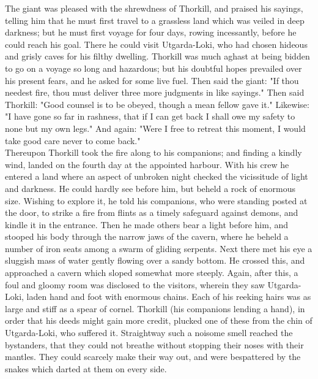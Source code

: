 \documentclass[10pt,a4paper]{report}
\begin{document}
The giant was pleased with the shrewdness of Thorkill, and praised his sayings, telling him that he must first travel to a grassless land which was veiled in deep darkness; but he must first voyage for four days, rowing incessantly, before he could reach his goal. There he could visit Utgarda-Loki, who had chosen hideous and grisly caves for his filthy dwelling. Thorkill was much aghast at being bidden to go on a voyage so long and hazardous; but his doubtful hopes prevailed over his present fears, and he asked for some live fuel. Then said the giant: "If thou needest fire, thou must deliver three more judgments in like sayings." Then said Thorkill: "Good counsel is to be obeyed, though a mean fellow gave it." Likewise: "I have gone so far in rashness, that if I can get back I shall owe my safety to none but my own legs." And again: "Were I free to retreat this moment, I would take good care never to come back."\\

Thereupon Thorkill took the fire along to his companions; and finding a kindly wind, landed on the fourth day at the appointed harbour. With his crew he entered a land where an aspect of unbroken night checked the vicissitude of light and darkness. He could hardly see before him, but beheld a rock of enormous size. Wishing to explore it, he told his companions, who were standing posted at the door, to strike a fire from flints as a timely safeguard against demons, and kindle it in the entrance. Then he made others bear a light before him, and stooped his body through the narrow jaws of the cavern, where he beheld a number of iron seats among a swarm of gliding serpents. Next there met his eye a sluggish mass of water gently flowing over a sandy bottom. He crossed this, and approached a cavern which sloped somewhat more steeply. Again, after this, a foul and gloomy room was disclosed to the visitors, wherein they saw Utgarda-Loki, laden hand and foot with enormous chains. Each of his reeking hairs was as large and stiff as a spear of cornel. Thorkill (his companions lending a hand), in order that his deeds might gain more credit, plucked one of these from the chin of Utgarda-Loki, who suffered it. Straightway such a noisome smell reached the bystanders, that they could not breathe without stopping their noses with their mantles. They could scarcely make their way out, and were bespattered by the snakes which darted at them on every side.\\
\end{document}
